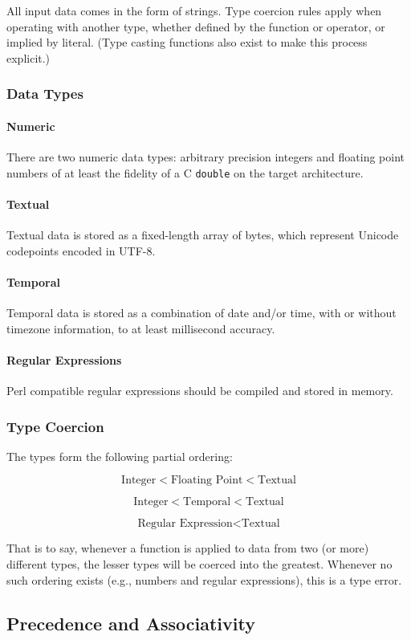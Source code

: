 All input data comes in the form of strings. Type coercion rules apply
when operating with another type, whether defined by the function or
operator, or implied by literal. (Type casting functions also exist to
make this process explicit.)

\subsubsection{Data Types}

\paragraph{Numeric}

There are two numeric data types: arbitrary precision integers and
floating point numbers of at least the fidelity of a C \texttt{double}
on the target architecture.

\paragraph{Textual}

Textual data is stored as a fixed-length array of bytes, which represent
Unicode codepoints encoded in UTF-8.

\paragraph{Temporal}


Temporal data is stored as a combination of date and/or time, with or
without timezone information, to at least millisecond accuracy.

\paragraph{Regular Expressions}


Perl compatible regular expressions should be compiled and stored in
memory.

\subsubsection{Type Coercion}

The types form the following partial ordering:

$$\textrm{Integer} < \textrm{Floating Point} < \textrm{Textual}$$

$$\textrm{Integer} < \textrm{Temporal} < \textrm{Textual}$$

$$\textrm{Regular Expression} < \textrm{Textual}$$

That is to say, whenever a function is applied to data from two (or
more) different types, the lesser types will be coerced into the
greatest. Whenever no such ordering exists (e.g., numbers and regular
expressions), this is a type error.


\subsection{Precedence and Associativity}

